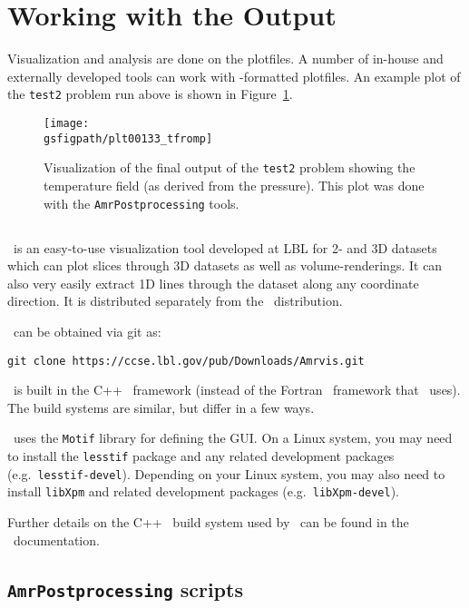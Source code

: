 \section{Working with the Output}

Visualization and analysis are done on the plotfiles.  A number of
in-house and externally developed tools can work
with \boxlib-formatted plotfiles.  An example plot of the {\tt test2}
problem run above is shown in Figure~\ref{fig:gettingstarted:test2}.

\begin{figure}[t]
\centering
\texttt{[image: \\gsfigpath/plt00133\_tfromp]}
\caption[Visualization of {\tt test2} output]{\label{fig:gettingstarted:test2} Visualization of the
final output of the {\tt test2} problem showing the temperature
field (as derived from the pressure).  This plot was done with
the {\tt AmrPostprocessing} tools.}
\end{figure}



\subsection{\amrvis}

\amrvis\ is an easy-to-use visualization tool developed at LBL for
2- and 3D datasets which can plot slices through 3D datasets as well
as volume-renderings.  It can also very easily extract 1D lines
through the dataset along any coordinate direction.  It is distributed
separately from the \maestro\ distribution.

\amrvis\ can be obtained via git as:
\begin{verbatim}
git clone https://ccse.lbl.gov/pub/Downloads/Amrvis.git
\end{verbatim}
\amrvis\ is built in the C++ \boxlib\ framework (instead of the Fortran 
\boxlib\ framework that \maestro\ uses).  The build systems are similar,
but differ in a few ways.  

\amrvis\ uses the {\tt Motif} library for defining the GUI.  On a Linux 
system, you may need to install the {\tt lesstif} package and any
related development packages (e.g.\ {\tt lesstif-devel}).  Depending
on your Linux system, you may also need to install {\tt libXpm} and
related development packages (e.g.\ {\tt libXpm-devel}).  

Further details on the C++ \boxlib\ build system used by \amrvis\
can be found in the \boxlib\ documentation.


\subsection{{\tt AmrPostprocessing} scripts}

